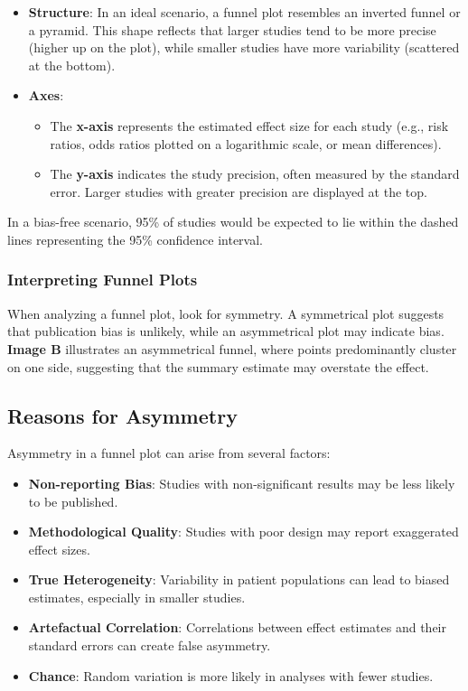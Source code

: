 \documentclass[
]{book}
\begin{document}
\begin{itemize}
\item
  \textbf{Structure}: In an ideal scenario, a funnel plot resembles an inverted funnel or a pyramid. This shape reflects that larger studies tend to be more precise (higher up on the plot), while smaller studies have more variability (scattered at the bottom).
\item
  \textbf{Axes}:

  \begin{itemize}
  \item
    The \textbf{x-axis} represents the estimated effect size for each study (e.g., risk ratios, odds ratios plotted on a logarithmic scale, or mean differences).
  \item
    The \textbf{y-axis} indicates the study precision, often measured by the standard error. Larger studies with greater precision are displayed at the top.
  \end{itemize}
\end{itemize}

In a bias-free scenario, 95\% of studies would be expected to lie within the dashed lines representing the 95\% confidence interval.

\subsubsection{Interpreting Funnel Plots}\label{interpreting-funnel-plots}

When analyzing a funnel plot, look for symmetry. A symmetrical plot suggests that publication bias is unlikely, while an asymmetrical plot may indicate bias. \textbf{Image B} illustrates an asymmetrical funnel, where points predominantly cluster on one side, suggesting that the summary estimate may overstate the effect.

\subsection{Reasons for Asymmetry}\label{reasons-for-asymmetry}

Asymmetry in a funnel plot can arise from several factors:

\begin{itemize}
\item
  \textbf{Non-reporting Bias}: Studies with non-significant results may be less likely to be published.
\item
  \textbf{Methodological Quality}: Studies with poor design may report exaggerated effect sizes.
\item
  \textbf{True Heterogeneity}: Variability in patient populations can lead to biased estimates, especially in smaller studies.
\item
  \textbf{Artefactual Correlation}: Correlations between effect estimates and their standard errors can create false asymmetry.
\item
  \textbf{Chance}: Random variation is more likely in analyses with fewer studies.
\end{itemize}
\end{document}
